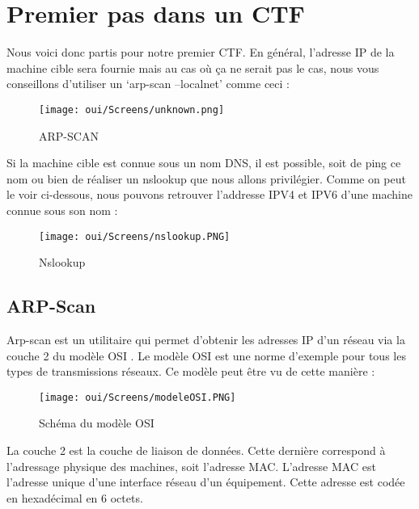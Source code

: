 \chapter{Premier pas dans un CTF}
\label{chap:BDD}

    Nous voici donc partis pour notre premier CTF. En général, l’adresse IP de la machine cible sera fournie mais au cas où ça ne serait pas le cas, nous vous conseillons d’utiliser un ‘arp-scan --localnet’ comme ceci :

\begin{figure}[htp!]
  \centering
  \setlength\figureheight{7cm}
  \setlength\figurewidth{9cm}
  \texttt{[image: oui/Screens/unknown.png]}
  \caption{ARP-SCAN}
  \label{fig:courbe-tikz}
\end{figure}

Si la machine cible est connue sous un nom DNS, il est possible, soit de ping ce nom ou bien de réaliser un nslookup que nous allons privilégier. Comme on peut le voir ci-dessous, nous pouvons retrouver l'addresse IPV4 et IPV6 d'une machine connue sous son nom :

\begin{figure}[htp!]
  \centering
  \setlength\figureheight{7cm}
  \setlength\figurewidth{9cm}
  \texttt{[image: oui/Screens/nslookup.PNG]}
  \caption{Nslookup}
  \label{fig:courbe-tikz}
\end{figure}

\newpage
\section{ARP-Scan}
Arp-scan est un utilitaire qui permet  d’obtenir les adresses IP d’un réseau via la couche 2 du modèle OSI . Le modèle OSI est une norme d’exemple pour tous les types de transmissions réseaux. Ce modèle peut être vu de cette manière :
\begin{figure}[htp!]
  \centering
  \setlength\figureheight{7cm}
  \setlength\figurewidth{9cm}
  \texttt{[image: oui/Screens/modeleOSI.PNG]}
  \caption{Schéma du modèle OSI}
  \label{fig:courbe-tikz}
\end{figure}

La couche 2 est la couche de liaison de données. Cette dernière correspond à l’adressage physique des machines, soit l’adresse MAC. L’adresse MAC est l’adresse unique d’une interface réseau d’un équipement. Cette adresse est codée en hexadécimal en 6 octets.

